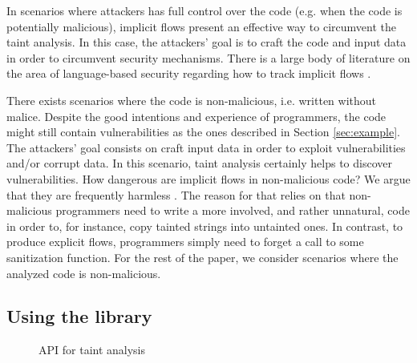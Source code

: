 \documentclass[oribibl]{llncs}
\begin{document}

In scenarios where attackers has full control over the code 
(e.g. when the code is potentially malicious), implicit flows present
an effective way to circumvent the taint
analysis. In this case, the attackers' goal  is to craft the code and input 
data in order to circumvent security mechanisms. There is a large body
of literature on the area of language-based security regarding 
how to track implicit flows \cite{Sabelfeld:Myers:JSAC}. 


There exists scenarios where 
the code is non-malicious, i.e. written without malice. 
Despite the good intentions and experience of programmers, 
the code might still contain vulnerabilities 
as the ones
described in Section \ref{sec:example}. The attackers' goal  
consists on craft input data in order to exploit 
vulnerabilities and/or corrupt data. In this scenario,
taint analysis certainly helps to discover vulnerabilities. 
How dangerous are implicit flows in non-malicious code? We argue that they
are frequently harmless \cite{Russo:IOS}. The reason for that 
relies on that non-malicious programmers
need to write a more involved, and rather unnatural,
code in order to, for instance, copy tainted strings into untainted ones. 
In contrast, to produce explicit flows, programmers simply
need to forget a call to some sanitization function. 
For the rest of the paper, we consider 
scenarios where the analyzed code is non-malicious. 



\subsection{Using the library}
\label{sec:using}
\begin{figure}[t]
{\small{
\begin{minipage}[t]{0.5\linewidth}
 
\end{minipage}
\hspace{40pt}
\begin{minipage}[t]{0.5\linewidth}
 
\end{minipage}
\caption{\label{fig:API}API for taint analysis}
}}
\end{figure}
\end{document}
